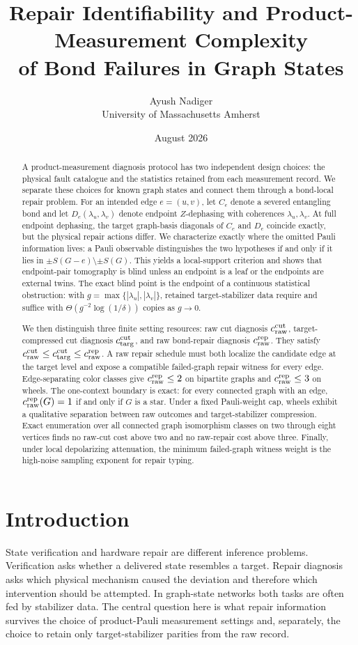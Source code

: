 \documentclass[11pt]{article}
\title{Repair Identifiability and Product-Measurement Complexity\\of Bond Failures in Graph States}
\author{Ayush Nadiger\\University of Massachusetts Amherst}
\date{August 2026}
\newcommand{\ccutraw}{c_{\rm raw}^{\rm cut}}
\newcommand{\cdiag}{c_{\rm targ}^{\rm cut}}
\newcommand{\crep}{c_{\rm raw}^{\rm rep}}
\begin{document}
\maketitle
\begin{abstract}
A product-measurement diagnosis protocol has two independent design choices: the physical fault catalogue and the statistics retained from each measurement record. We separate these choices for known graph states and connect them through a bond-local repair problem. For an intended edge $e=(u,v)$, let $C_e$ denote a severed entangling bond and let $D_e(\lambda_u,\lambda_v)$ denote endpoint $Z$-dephasing with coherences $\lambda_u,\lambda_v$. At full endpoint dephasing, the target graph-basis diagonals of $C_e$ and $D_e$ coincide exactly, but the physical repair actions differ. We characterize exactly where the omitted Pauli information lives: a Pauli observable distinguishes the two hypotheses if and only if it lies in $\pm S(G-e)\setminus\pm S(G)$. This yields a local-support criterion and shows that endpoint-pair tomography is blind unless an endpoint is a leaf or the endpoints are external twins. The exact blind point is the endpoint of a continuous statistical obstruction: with $g=\max\{|\lambda_u|,|\lambda_v|\}$, retained target-stabilizer data require and suffice with $\Theta(g^{-2}\log(1/\delta))$ copies as $g\to0$.

We then distinguish three finite setting resources: raw cut diagnosis $\ccutraw$, target-compressed cut diagnosis $\cdiag$, and raw bond-repair diagnosis $\crep$. They satisfy $\ccutraw\le\cdiag\le\crep$. A raw repair schedule must both localize the candidate edge at the target level and expose a compatible failed-graph repair witness for every edge. Edge-separating color classes give $\crep\le2$ on bipartite graphs and $\crep\le3$ on wheels. The one-context boundary is exact: for every connected graph with an edge, $\crep(G)=1$ if and only if $G$ is a star. Under a fixed Pauli-weight cap, wheels exhibit a qualitative separation between raw outcomes and target-stabilizer compression. Exact enumeration over all connected graph isomorphism classes on two through eight vertices finds no raw-cut cost above two and no raw-repair cost above three. Finally, under local depolarizing attenuation, the minimum failed-graph witness weight is the high-noise sampling exponent for repair typing.
\end{abstract}

\section{Introduction}
State verification and hardware repair are different inference problems. Verification asks whether a delivered state resembles a target. Repair diagnosis asks which physical mechanism caused the deviation and therefore which intervention should be attempted. In graph-state networks both tasks are often fed by stabilizer data. The central question here is what repair information survives the choice of product-Pauli measurement settings and, separately, the choice to retain only target-stabilizer parities from the raw record.
\end{document}
